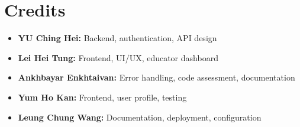 \documentclass[a4paper,11pt]{scrartcl}
\begin{document}
\section{Credits}

\begin{itemize}[leftmargin=*]
    \item \textbf{YU Ching Hei:} Backend, authentication, API design
    \item \textbf{Lei Hei Tung:} Frontend, UI/UX, educator dashboard
    \item \textbf{Ankhbayar Enkhtaivan:} Error handling, code assessment, documentation
    \item \textbf{Yum Ho Kan:} Frontend, user profile, testing
    \item \textbf{Leung Chung Wang:} Documentation, deployment, configuration
\end{itemize}
\end{document}
